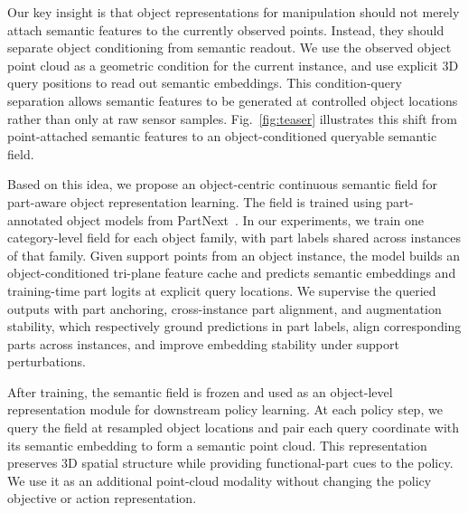 Our key insight is that object representations for manipulation should not merely attach semantic features to the currently observed points. Instead, they should separate object conditioning from semantic readout. We use the observed object point cloud as a geometric condition for the current instance, and use explicit 3D query positions to read out semantic embeddings. This condition-query separation allows semantic features to be generated at controlled object locations rather than only at raw sensor samples. Fig.~\ref{fig:teaser} illustrates this shift from point-attached semantic features to an object-conditioned queryable semantic field.

Based on this idea, we propose an object-centric continuous semantic field for part-aware object representation learning. The field is trained using part-annotated object models from PartNext~\cite{wang2026partnext}. In our experiments, we train one category-level field for each object family, with part labels shared across instances of that family. Given support points from an object instance, the model builds an object-conditioned tri-plane feature cache and predicts semantic embeddings and training-time part logits at explicit query locations. We supervise the queried outputs with part anchoring, cross-instance part alignment, and augmentation stability, which respectively ground predictions in part labels, align corresponding parts across instances, and improve embedding stability under support perturbations.

After training, the semantic field is frozen and used as an object-level representation module for downstream policy learning. At each policy step, we query the field at resampled object locations and pair each query coordinate with its semantic embedding to form a semantic point cloud. This representation preserves 3D spatial structure while providing functional-part cues to the policy. We use it as an additional point-cloud modality without changing the policy objective or action representation.

